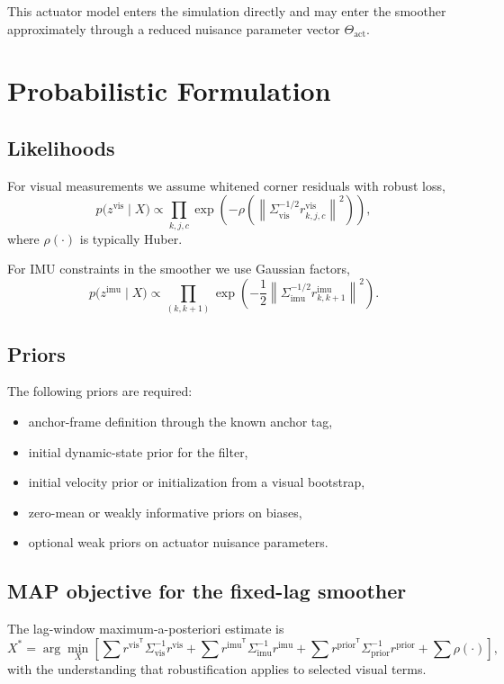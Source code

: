 \documentclass[11pt]{article}
\newcommand{\norm}[1]{\left\lVert #1 \right\rVert}
\newcommand{\trans}{^{\mathsf T}}
\begin{document}
This actuator model enters the simulation directly and may enter the smoother approximately through a reduced nuisance parameter vector $\Theta_{\mathrm{act}}$.

\section{Probabilistic Formulation}
\subsection{Likelihoods}
For visual measurements we assume whitened corner residuals with robust loss,
\begin{equation}
    p\big(z^{\mathrm{vis}}\mid X\big) \propto \prod_{k,j,c} \exp\!\left(-\rho\left(\norm{\Sigma_{\mathrm{vis}}^{-1/2} r^{\mathrm{vis}}_{k,j,c}}^2\right)\right),
\end{equation}
where $\rho(\cdot)$ is typically Huber.

For IMU constraints in the smoother we use Gaussian factors,
\begin{equation}
    p\big(z^{\mathrm{imu}}\mid X\big) \propto \prod_{(k,k+1)} \exp\!\left(-\frac{1}{2}\norm{\Sigma_{\mathrm{imu}}^{-1/2} r^{\mathrm{imu}}_{k,k+1}}^2\right).
\end{equation}

\subsection{Priors}
The following priors are required:
\begin{itemize}[leftmargin=1.5em]
    \item anchor-frame definition through the known anchor tag,
    \item initial dynamic-state prior for the filter,
    \item initial velocity prior or initialization from a visual bootstrap,
    \item zero-mean or weakly informative priors on biases,
    \item optional weak priors on actuator nuisance parameters.
\end{itemize}

\subsection{MAP objective for the fixed-lag smoother}
The lag-window maximum-a-posteriori estimate is
\begin{equation}
    X^* = \arg\min_X \left[
    \sum r^{\mathrm{vis}\trans} \Sigma_{\mathrm{vis}}^{-1} r^{\mathrm{vis}}
    + \sum r^{\mathrm{imu}\trans} \Sigma_{\mathrm{imu}}^{-1} r^{\mathrm{imu}}
    + \sum r^{\mathrm{prior}\trans} \Sigma_{\mathrm{prior}}^{-1} r^{\mathrm{prior}}
    + \sum \rho(\cdot)
    \right],
\end{equation}
with the understanding that robustification applies to selected visual terms.
\end{document}
